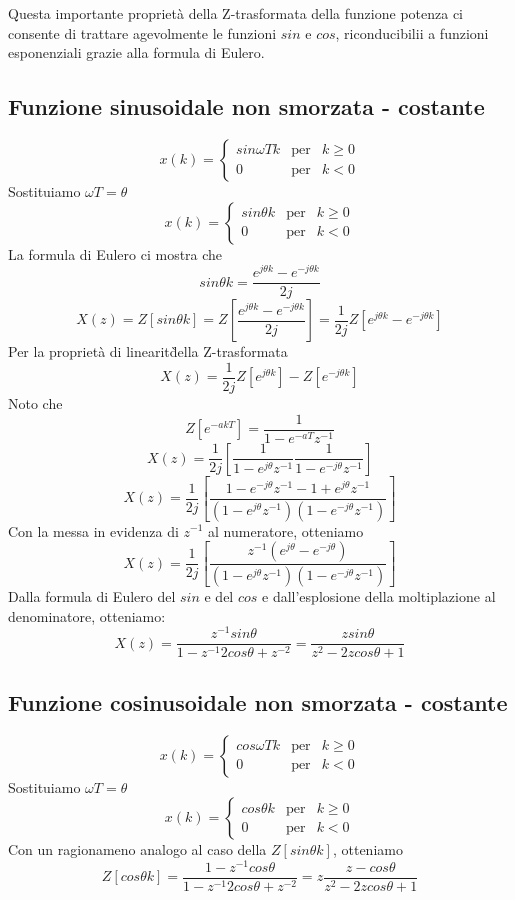 \documentclass[a4paper]{report}
\begin{document}
Questa importante propriet\`a della Z-trasformata della funzione
potenza ci consente di trattare agevolmente le funzioni $sin$ e $cos$,
riconducibilii a funzioni esponenziali grazie alla formula di Eulero.

\subsection{Funzione sinusoidale non smorzata - costante}
\[
x(k) =
\left\{
\begin{array}{lll}
  sin \omega Tk & \textrm{per} & k \geq 0\\
  0 & \textrm{per} & k < 0
\end{array}
\right.
\]
Sostituiamo $\omega T = \theta$
\[
x(k) =
\left\{
\begin{array}{lll}
  sin \theta k & \textrm{per} & k \geq 0\\
  0 & \textrm{per} & k < 0
\end{array}
\right.
\]
La formula di Eulero ci mostra che
\[
sin \theta k = \dfrac{e^{j\theta k} - e^{-j \theta k}}{2j}
\]
\[
X(z) = Z[sin \theta k] = Z \left[ \dfrac{e^{j\theta k} - e^{-j \theta
      k}}{2j} \right] = \dfrac{1}{2j} Z \left[ e^{j\theta k} - e^{-j
    \theta k} \right]
\]
Per la propriet\`a di linearit\` della Z-trasformata
\[
X(z) = \dfrac{1}{2j} Z [e^{j\theta k}] - Z [e^{-j\theta k}]
\]
Noto che
\[
Z[e^{-akT}] = \dfrac{1}{1 - e^{-aT}z^{-1}}
\]
\[
X(z) = \dfrac{1}{2j} \left[ \dfrac{1}{1 - e^{j\theta}
    z^{-1}}\dfrac{1}{1 - e^{-j\theta} z^{-1}}\right] 
\]
\[
X(z) = \dfrac{1}{2j} \left[ \dfrac{1 - e^{-j \theta}z^{-1} -1 + e^{j
      \theta}z^{-1} }{(1 - e^{j\theta}z^{-1}) (1 - e^{-j\theta}
    z^{-1})}\right]
\]
Con la messa in evidenza di $z^{-1}$ al numeratore, otteniamo
\[
X(z) = \dfrac{1}{2j} \left[ \dfrac{z^{-1}(e^{j\theta} - e^{-j
      \theta})}{(1 - e^{j\theta}z^{-1}) (1 - e^{-j\theta}
    z^{-1})}\right]
\]
Dalla formula di Eulero del $sin$ e del $cos$ e dall'esplosione della
moltiplazione al denominatore, otteniamo:
\[
X(z) = \dfrac{z^{-1} sin \theta}{1 - z^{-1} 2 cos \theta + z^{-2}} =
\dfrac{z sin \theta}{z^2 - 2 z cos \theta + 1}
\]

\subsection{Funzione cosinusoidale non smorzata - costante}
\[
x(k) =
\left\{
\begin{array}{lll}
  cos \omega Tk & \textrm{per} & k \geq 0\\
  0 & \textrm{per} & k < 0
\end{array}
\right.
\]
Sostituiamo $\omega T = \theta$
\[
x(k) =
\left\{
\begin{array}{lll}
  cos \theta k & \textrm{per} & k \geq 0\\
  0 & \textrm{per} & k < 0
\end{array}
\right.
\]
Con un ragionameno analogo al caso della $Z[sin \theta k]$, otteniamo
\[
Z[cos \theta k] = \dfrac{1 - z^{-1} cos \theta}{1 - z^{-1} 2 cos
  \theta + z^{-2}} = z \dfrac{z - cos \theta}{z^2 - 2z cos \theta + 1}
\]
\end{document}
